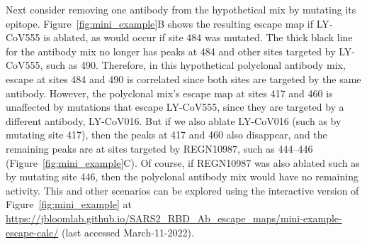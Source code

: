 \documentclass[9pt,twocolumn,twoside]{gsajnl_modified}
\begin{document}
Next consider removing one antibody from the hypothetical mix by mutating its epitope.
Figure~\ref{fig:mini_example}B shows the resulting escape map if LY-CoV555 is ablated, as would occur if site 484 was mutated.
The thick black line for the antibody mix no longer has peaks at 484 and other sites targeted by LY-CoV555, such as 490.
Therefore, in this hypothetical polyclonal antibody mix, escape at sites 484 and 490 is correlated since both sites are targeted by the same antibody.
However, the polyclonal mix's escape map at sites 417 and 460 is unaffected by mutations that escape LY-CoV555, since they are targeted by a different antibody, LY-CoV016.
But if we also ablate LY-CoV016 (such as by mutating site 417), then the peaks at 417 and 460 also disappear, and the remaining peaks are at sites targeted by REGN10987, such as 444--446 (Figure~\ref{fig:mini_example}C).
Of course, if REGN10987 was also ablated such as by mutating site 446, then the polyclonal antibody mix would have no remaining activity.
This and other scenarios can be explored using the interactive version of Figure~\ref{fig:mini_example} at \url{https://jbloomlab.github.io/SARS2_RBD_Ab_escape_maps/mini-example-escape-calc/} (last accessed March-11-2022).
\end{document}

